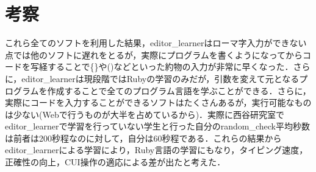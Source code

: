 \section{考察}\label{ux8003ux5bdf}

これら全てのソフトを利用した結果，editor\_learnerはローマ字入力ができない点では他のソフトに遅れをとるが，実際にプログラムを書くようになってからコードを写経することで\{\}や()などといった約物の入力が非常に早くなった．さらに，editor\_learnerは現段階ではRubyの学習のみだが，引数を変えて元となるプログラムを作成することで全てのプログラム言語を学ぶことができる．さらに，実際にコードを入力することができるソフトはたくさんあるが，実行可能なものは少ない(Webで行うものが大半を占めているから)．実際に西谷研究室でeditor\_learnerで学習を行っていない学生と行った自分のrandom\_check平均秒数は前者は200秒程なのに対して，自分は60秒程である．これらの結果からeditor\_learnerによる学習により，Ruby言語の学習にもなり，タイピング速度，正確性の向上，CUI操作の適応による差が出たと考えた．

    